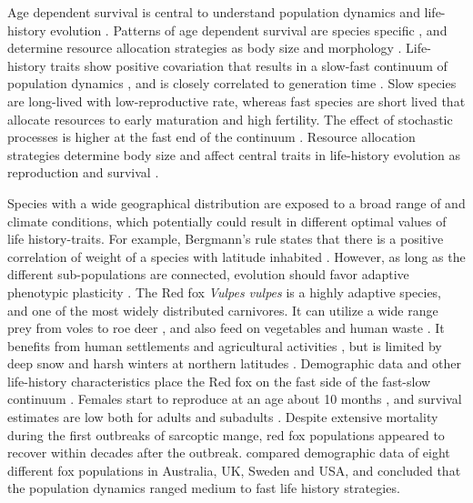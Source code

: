 \documentclass[12pt, a4paper]{article}
\begin{document}
Age dependent survival is central to understand population dynamics and life-history evolution \citep{stearnsLifeHistoryEvolution2000,lande2003stochastic,stearnsLifeHistoryEvolution2000}. Patterns of age dependent survival are species specific  \citep{martinPatternsMechanismsAgeDependent1995,loisonAGESPECIFICSURVIVALFIVE}, and determine resource allocation strategies as body size and morphology \citep{roffPredictingBodySize1986,siblyEffectsBodySize2007,brooksHowWellCan2016}. Life-history traits show positive covariation that results in a slow-fast continuum of population dynamics \citep{oliFastSlowContinuum2004}, and is closely correlated to generation time \citep{krausLivingSlowDying2005}. Slow species are long-lived with low-reproductive rate, whereas fast species are short lived that allocate resources to early maturation and high fertility. The effect of stochastic processes is higher at the fast end of the continuum \citep{saetherHowLifeHistory2013}. Resource allocation strategies determine body size and affect central traits  in life-history evolution as reproduction and survival \citep{roffPredictingBodySize1986,siblyEffectsBodySize2007,brooksHowWellCan2016}.

Species with a wide geographical distribution are exposed to a broad range of  and climate conditions, which potentially could result in different optimal values of life history-traits. For example, Bergmann's rule states that there is a positive correlation of weight of a species with latitude inhabited \citep{blanckenhornEvolutionBodySize2000}. However, as long as the different sub-populations are connected, evolution should favor adaptive phenotypic plasticity \citep{mcnamaraStatedependentLifeHistories1996,kaweckiEvolutionLifeHistories1993}. The Red fox \emph{Vulpes vulpes} is a highly adaptive species, and one of the most widely distributed carnivores. It can utilize a wide range prey from voles to roe deer \citep{englund1970some,kjellanderCyclicVolesPrey2003}, and also feed on vegetables and human waste \citep{carvalho2001food,}. It benefits from human settlements and agricultural activities \citep{jahrenImpactHumanLand2020,gallantDisentanglingRelativeInfluences2020,vuorisaloUrbanRedFoxes2014}, but is limited by deep snow and harsh winters at northern latitudes \citep{bartonWinterSeverityLimits2007,frafjord1998red}. Demographic data and other life-history characteristics place the Red fox on the fast side of the fast-slow continuum \citep{heppellLifeHistoriesElasticity2000}. Females start to reproduce at an age about 10 months \citep{englund1970some}, and survival estimates are low both for adults and subadults \citep{devenish-nelsonDemographyCarnivoreRed2013, willebrandDecliningSurvivalRates2022}. Despite extensive mortality during the first outbreaks of sarcoptic mange, red fox populations appeared to recover within decades after the outbreak\citep{soulsbury2007impact,willebrandDecliningSurvivalRates2022}. \citet{devenish-nelsonDemographyCarnivoreRed2013} compared demographic data of eight different fox populations in Australia, UK, Sweden and USA, and concluded that the population dynamics ranged medium to fast life history strategies.
\end{document}
